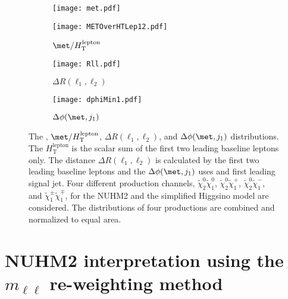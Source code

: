 \begin{figure}[htbp]
    \begin{center}
        \begin{subfigure}[b]{0.48\textwidth}
            \texttt{[image: met.pdf]}
            \caption{\met}
        \end{subfigure}
        \begin{subfigure}[b]{0.48\textwidth}
            \texttt{[image: METOverHTLep12.pdf]}
            \caption{$\met/H_\mathrm{T}^\mathrm{lepton}$}
        \end{subfigure}
        \begin{subfigure}[b]{0.48\textwidth}
            \texttt{[image: Rll.pdf]}
            \caption{$\Delta R(\ell_{1}, \ell_{2})$}
        \end{subfigure}
        \begin{subfigure}[b]{0.48\textwidth}
            \texttt{[image: dphiMin1.pdf]}
            \caption{$\Delta \phi(\met, j_{1})$}
        \end{subfigure}
    \end{center}
    \caption{The \met, $\met/H_\mathrm{T}^\mathrm{lepton}$, $\Delta R(\ell_{1}, \ell_{2})$, and $\Delta \phi(\met, j_{1})$ distributions.
    The $H_\mathrm{T}^\mathrm{lepton}$ is the scalar sum of the first two leading baseline leptons \pt only.
    The distance $\Delta R(\ell_{1}, \ell_{2})$ is calculated by the first two leading baseline leptons and the $\Delta \phi(\met, j_{1})$ uses \met and first leading signal jet.
    Four different production channels, $\widetilde{\chi}^{0}_{2}\widetilde{\chi}^{0}_{1}$, $\widetilde{\chi}^{0}_{2}\widetilde{\chi}^{+}_{1}$, $\widetilde{\chi}^{0}_{2}\widetilde{\chi}^{-}_{1}$, and $\widetilde{\chi}^{\pm}_{1}\widetilde{\chi}^{\mp}_{1}$, for the NUHM2 and the simplified Higgsino model are considered.
    The distributions of four productions are combined and normalized to equal area.}
    \label{fig:results_nuhm2_met_METOverHTLep12_Rll_dphiMin1}
\end{figure}




\section{NUHM2 interpretation using the $m_{\ell \ell}$ re-weighting method}
\label{sec:results_mll_reweighting}




